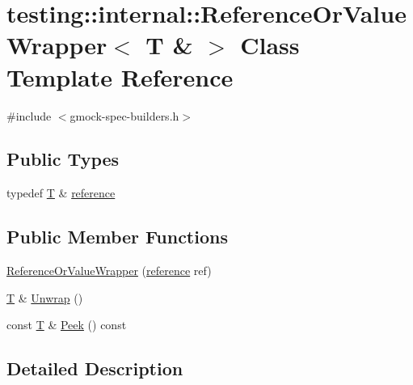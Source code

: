 \hypertarget{classtesting_1_1internal_1_1_reference_or_value_wrapper_3_01_t_01_6_01_4}{}\section{testing\+:\+:internal\+:\+:Reference\+Or\+Value\+Wrapper$<$ T \& $>$ Class Template Reference}
\label{classtesting_1_1internal_1_1_reference_or_value_wrapper_3_01_t_01_6_01_4}


{\ttfamily \#include $<$gmock-\/spec-\/builders.\+h$>$}

\subsection*{Public Types}
\begin{DoxyCompactItemize}
\item 
typedef \hyperlink{functions__7_8js_adf1f3edb9115acb0a1e04209b7a9937b}{T} \& \hyperlink{classtesting_1_1internal_1_1_reference_or_value_wrapper_3_01_t_01_6_01_4_a62e7f6ebcf40daa08130ea52fd0215ee}{reference}
\end{DoxyCompactItemize}
\subsection*{Public Member Functions}
\begin{DoxyCompactItemize}
\item 
\hyperlink{classtesting_1_1internal_1_1_reference_or_value_wrapper_3_01_t_01_6_01_4_ad31b242ceae7f318096c78a798b33379}{Reference\+Or\+Value\+Wrapper} (\hyperlink{classtesting_1_1internal_1_1_reference_or_value_wrapper_3_01_t_01_6_01_4_a62e7f6ebcf40daa08130ea52fd0215ee}{reference} ref)
\item 
\hyperlink{functions__7_8js_adf1f3edb9115acb0a1e04209b7a9937b}{T} \& \hyperlink{classtesting_1_1internal_1_1_reference_or_value_wrapper_3_01_t_01_6_01_4_a0b95dd4e20f237aee89864507172706e}{Unwrap} ()
\item 
const \hyperlink{functions__7_8js_adf1f3edb9115acb0a1e04209b7a9937b}{T} \& \hyperlink{classtesting_1_1internal_1_1_reference_or_value_wrapper_3_01_t_01_6_01_4_ac60d6889405e793259fe409255df2299}{Peek} () const 
\end{DoxyCompactItemize}


\subsection{Detailed Description}
